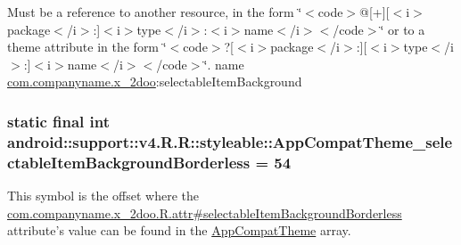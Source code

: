 Must be a reference to another resource, in the form \char`\"{}$<$code$>$@\mbox{[}+\mbox{]}\mbox{[}$<$i$>$package$<$/i$>$:\mbox{]}$<$i$>$type$<$/i$>$:$<$i$>$name$<$/i$>$$<$/code$>$\char`\"{} or to a theme attribute in the form \char`\"{}$<$code$>$?\mbox{[}$<$i$>$package$<$/i$>$:\mbox{]}\mbox{[}$<$i$>$type$<$/i$>$:\mbox{]}$<$i$>$name$<$/i$>$$<$/code$>$\char`\"{}.  name \hyperlink{namespacecom_1_1companyname_1_1x__2doo}{com.companyname.x\_\-2doo}:selectableItemBackground \hypertarget{classandroid_1_1support_1_1v4_1_1_r_1_1styleable_113f8fa7701e681a079ae443df1e2758}{
\subsubsection[{AppCompatTheme\_\-selectableItemBackgroundBorderless}]{\setlength{\rightskip}{0pt plus 5cm}static final int android::support::v4.R.R::styleable::AppCompatTheme\_\-selectableItemBackgroundBorderless = 54}}
\label{classandroid_1_1support_1_1v4_1_1_r_1_1styleable_113f8fa7701e681a079ae443df1e2758}


This symbol is the offset where the \hyperlink{classcom_1_1companyname_1_1x__2doo_1_1_r_1_1attr_5cb1f552a165d6b177d3dfdf94f98487}{com.companyname.x\_\-2doo.R.attr\#selectableItemBackgroundBorderless} attribute's value can be found in the \hyperlink{classandroid_1_1support_1_1v4_1_1_r_1_1styleable_0873e92ba21076bb5a4aeadeb7f5779f}{AppCompatTheme} array.

